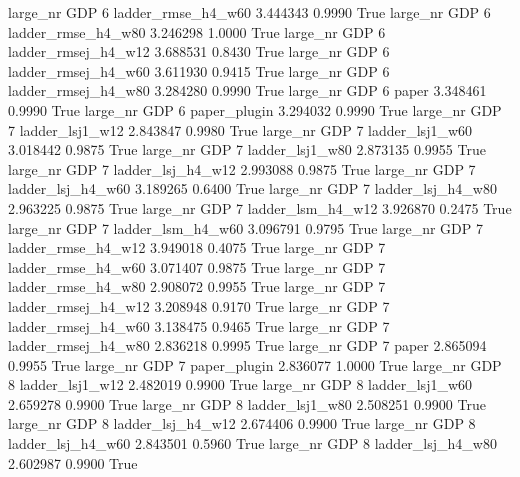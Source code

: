   large_nr      GDP                 6  ladder_rmse_h4_w60    3.444343      0.9990    True
  large_nr      GDP                 6  ladder_rmse_h4_w80    3.246298      1.0000    True
  large_nr      GDP                 6 ladder_rmsej_h4_w12    3.688531      0.8430    True
  large_nr      GDP                 6 ladder_rmsej_h4_w60    3.611930      0.9415    True
  large_nr      GDP                 6 ladder_rmsej_h4_w80    3.284280      0.9990    True
  large_nr      GDP                 6               paper    3.348461      0.9990    True
  large_nr      GDP                 6        paper_plugin    3.294032      0.9990    True
  large_nr      GDP                 7     ladder_lsj1_w12    2.843847      0.9980    True
  large_nr      GDP                 7     ladder_lsj1_w60    3.018442      0.9875    True
  large_nr      GDP                 7     ladder_lsj1_w80    2.873135      0.9955    True
  large_nr      GDP                 7   ladder_lsj_h4_w12    2.993088      0.9875    True
  large_nr      GDP                 7   ladder_lsj_h4_w60    3.189265      0.6400    True
  large_nr      GDP                 7   ladder_lsj_h4_w80    2.963225      0.9875    True
  large_nr      GDP                 7   ladder_lsm_h4_w12    3.926870      0.2475    True
  large_nr      GDP                 7   ladder_lsm_h4_w60    3.096791      0.9795    True
  large_nr      GDP                 7  ladder_rmse_h4_w12    3.949018      0.4075    True
  large_nr      GDP                 7  ladder_rmse_h4_w60    3.071407      0.9875    True
  large_nr      GDP                 7  ladder_rmse_h4_w80    2.908072      0.9955    True
  large_nr      GDP                 7 ladder_rmsej_h4_w12    3.208948      0.9170    True
  large_nr      GDP                 7 ladder_rmsej_h4_w60    3.138475      0.9465    True
  large_nr      GDP                 7 ladder_rmsej_h4_w80    2.836218      0.9995    True
  large_nr      GDP                 7               paper    2.865094      0.9955    True
  large_nr      GDP                 7        paper_plugin    2.836077      1.0000    True
  large_nr      GDP                 8     ladder_lsj1_w12    2.482019      0.9900    True
  large_nr      GDP                 8     ladder_lsj1_w60    2.659278      0.9900    True
  large_nr      GDP                 8     ladder_lsj1_w80    2.508251      0.9900    True
  large_nr      GDP                 8   ladder_lsj_h4_w12    2.674406      0.9900    True
  large_nr      GDP                 8   ladder_lsj_h4_w60    2.843501      0.5960    True
  large_nr      GDP                 8   ladder_lsj_h4_w80    2.602987      0.9900    True
